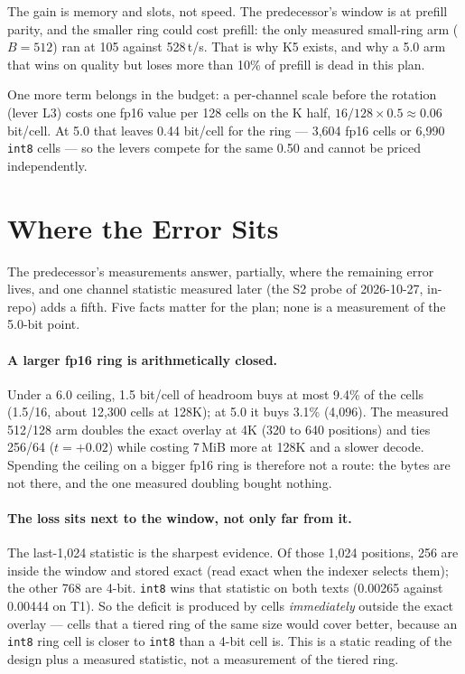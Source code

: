\documentclass[10pt,twocolumn]{article}
\begin{document}
The gain is memory and slots, not speed. The predecessor's window is at prefill parity, and the smaller ring could cost prefill: the only measured small-ring arm ($B{=}512$) ran at 105 against 528\,t/s. That is why K5 exists, and why a 5.0 arm that wins on quality but loses more than 10\% of prefill is dead in this plan.

One more term belongs in the budget: a per-channel scale before the rotation (lever L3) costs one fp16 value per 128 cells on the K half, $16/128 \times 0.5 \approx 0.06$ bit/cell. At 5.0 that leaves 0.44 bit/cell for the ring --- 3,604 fp16 cells or 6,990 \texttt{int8} cells --- so the levers compete for the same 0.50 and cannot be priced independently.

\section{Where the Error Sits}\label{sec:error}

The predecessor's measurements answer, partially, where the remaining error lives, and one channel statistic measured later (the S2 probe of 2026-10-27, in-repo) adds a fifth. Five facts matter for the plan; none is a measurement of the 5.0-bit point.

\paragraph{A larger fp16 ring is arithmetically closed.} Under a 6.0 ceiling, 1.5 bit/cell of headroom buys at most 9.4\% of the cells (1.5/16, about 12,300 cells at 128K); at 5.0 it buys 3.1\% (4,096). The measured 512/128 arm doubles the exact overlay at 4K (320 to 640 positions) and ties 256/64 ($t{=}+0.02$) while costing 7\,MiB more at 128K and a slower decode. Spending the ceiling on a bigger fp16 ring is therefore not a route: the bytes are not there, and the one measured doubling bought nothing.

\paragraph{The loss sits next to the window, not only far from it.} The last-1,024 statistic is the sharpest evidence. Of those 1,024 positions, 256 are inside the window and stored exact (read exact when the indexer selects them); the other 768 are 4-bit. \texttt{int8} wins that statistic on both texts (0.00265 against 0.00444 on T1). So the deficit is produced by cells \emph{immediately} outside the exact overlay --- cells that a tiered ring of the same size would cover better, because an \texttt{int8} ring cell is closer to \texttt{int8} than a 4-bit cell is. This is a static reading of the design plus a measured statistic, not a measurement of the tiered ring.
\end{document}
